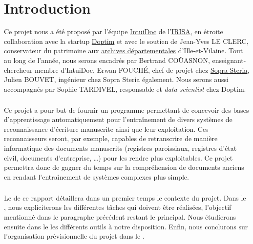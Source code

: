 \chapter{Introduction}
\setcounter{page}{1}

Ce projet nous a été proposé par l’équipe \href{https://www-intuidoc.irisa.fr/}{IntuiDoc}
de l’\href{https://www.irisa.fr/}{IRISA}, en étroite collaboration avec la startup
\href{http://www.doptim.eu}{Doptim} et avec le soutien de Jean-Yves LE CLERC, conservateur du
patrimoine aux \href{http://archives.ille-et-vilaine.fr/fr}{archives départementales} d'Ille-et-Vilaine.
Tout au long de l’année, nous serons encadrés par Bertrand COÜASNON, enseignant-chercheur membre d'IntuiDoc,
Erwan FOUCHÉ, chef de projet chez \href{https://www.soprasteria.com/fr}{Sopra Steria}, Julien BOUVET,
ingénieur chez Sopra Steria également. Nous serons aussi accompagnés par Sophie TARDIVEL, responsable
et \textit{data scientist} chez Doptim.

\paragraph{}
Ce projet a pour but de fournir un programme permettant de concevoir des bases d’apprentissage
automatiquement pour l’entraînement de divers systèmes de reconnaissance d’écriture manuscrite
ainsi que leur exploitation. Ces reconnaisseurs seront, par exemple, capables de retranscrire
de manière informatique des documents manuscrits (registres paroissiaux, registres d’état civil,
documents d’entreprise, \ldots) pour les rendre plus exploitables. Ce projet permettra donc de gagner
du temps sur la compréhension de documents anciens en rendant l’entraînement de systèmes complexes
plus simple.

\paragraph{}
Le  de ce rapport détaillera dans un premier temps le contexte du projet.
Dans le , nous expliciterons les différentes tâches qui doivent être réalisées,
l’objectif mentionné dans le paragraphe précédent restant le principal. Nous étudierons ensuite dans le
 les différents outils à notre disposition. Enfin, nous conclurons sur l’organisation
prévisionnelle du projet dans le .

